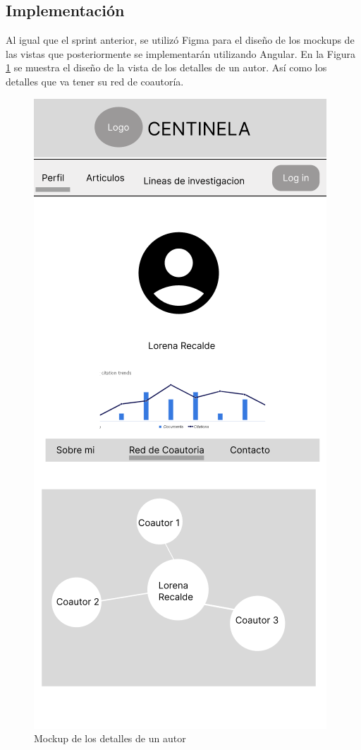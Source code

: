 \subsection{Implementación}
Al igual que el sprint anterior, se utilizó Figma para el diseño de los mockups de las vistas que posteriormente se implementarán utilizando Angular.
En la Figura \ref{fig:mobile-first-network} se muestra el diseño de la vista de los detalles de un autor. Así como los detalles que va tener su red de coautoría.

\begin{figure}[H]
    \centering
    \includegraphics[scale=0.5]{../02Figures/02Chapter/Sprints/Sprint-2/mobile-first-network.png}
    \caption{Mockup de los detalles de un autor}
    \label{fig:mobile-first-network}
\end{figure}

